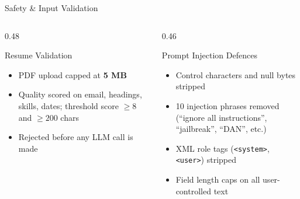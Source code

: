 \documentclass[aspectratio=169]{beamer}
\begin{document}
\begin{frame}{Safety \& Input Validation}
  \begin{columns}[t]
    \begin{column}{0.48\textwidth}
      \begin{block}{Resume Validation}
        \begin{itemize}\small\setlength{\itemsep}{5pt}
          \item PDF upload capped at \textbf{5 MB}
          \item Quality scored on email, headings, skills, dates; threshold score $\geq8$ and $\geq200$ chars
          \item Rejected before any LLM call is made
        \end{itemize}
      \end{block}
    \end{column}
    \begin{column}{0.46\textwidth}
      \begin{block}{Prompt Injection Defences}
        \begin{itemize}\small\setlength{\itemsep}{5pt}
          \item Control characters and null bytes stripped
          \item 10 injection phrases removed (``ignore all instructions'', ``jailbreak'', ``DAN'', etc.)
          \item XML role tags (\texttt{<system>}, \texttt{<user>}) stripped
          \item Field length caps on all user-controlled text
        \end{itemize}
      \end{block}
    \end{column}
  \end{columns}
\end{frame}
\end{document}
